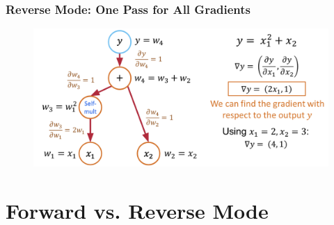 \documentclass[notes]{beamer}
\begin{document}
\begin{frame}
	\frametitle{Reverse Mode: One Pass for All Gradients}
	\begin{figure}[ht]
		\centering
		\includegraphics[width=\textwidth]{figs/ad7.png}
	\end{figure}
	
\end{frame}

\section{Forward vs. Reverse Mode}
\end{document}
